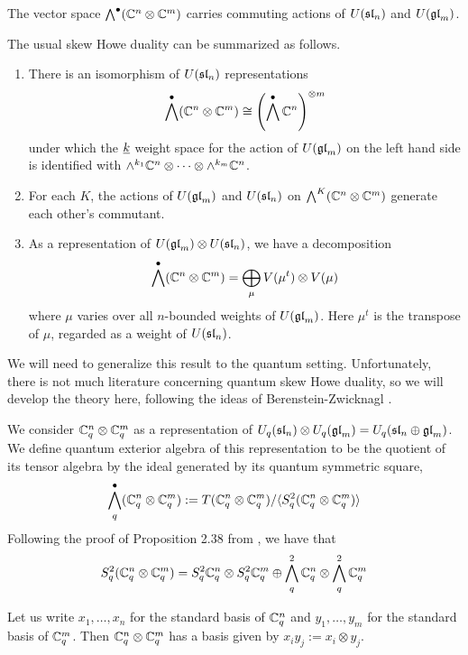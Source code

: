 \documentclass[11pt,leqno]{article}
\begin{document}
The vector space $\Alt^\bullet(\mathbb C^n \otimes \mathbb C^m)$ carries commuting actions of $U(\sl_n)$ and $U(\gl_m)$. 

\begin{thm}\mbox{}
The usual skew Howe duality can be summarized as follows.
\begin{enumerate}
\item There is an isomorphism of $ U(\sl_n) $ representations 
\begin{equation}
 \Alt^\bullet(\mathbb C^n \otimes \mathbb C^m) \cong \left( \Alt^\bullet \bC^n \right)^{\otimes m}
 \end{equation}
under which the $ \ul{k} $ weight space for the action of $ U(\gl_m) $ on the left hand side is identified with $\alt^{k_1} \mathbb C^n \otimes \cdots \otimes \alt^{k_m} \mathbb C^n$.
\item For each $ K $, the actions of $ U(\gl_m) $ and $ U(\sl_n) $ on $ \Alt^K(\bC^n \otimes \bC^m) $ generate each other's commutant.
\item As a representation of $ U(\gl_m) \otimes U(\sl_n)$, we have a decomposition
$$ \Alt^\bullet (\mathbb C^n \otimes \mathbb C^m) = \bigoplus_{\mu} V(\mu^t) \otimes V(\mu) $$
where $\mu$ varies over all $n$-bounded weights of $U(\gl_m)$. Here $\mu^t$ is the transpose of $\mu$, regarded as a weight of $U(\sl_n)$.
\end{enumerate}
\end{thm}

We will need to generalize this result to the quantum setting.  Unfortunately, there is not much literature concerning quantum skew Howe duality, so we will develop the theory here, following the ideas of Berenstein-Zwicknagl \cite{BZ}.  

We consider $ \bC^n_q \otimes \bC^m_q $ as a representation of $U_q(\sl_n) \otimes U_q(\gl_m) = U_q(\sl_n \oplus \gl_m) $.
We define quantum exterior algebra of this representation to be the quotient of its tensor algebra by the ideal generated by its quantum symmetric square,
$$\Alt^\bullet_q(\bC_q^n \otimes \bC_q^m) := T (\bC_q^n \otimes \bC_q^m) / \langle S^2_q (\bC_q^n \otimes \bC_q^m) \rangle$$
Following the proof of Proposition 2.38 from \cite{BZ}, we have that 
$$ S^2_q (\bC_q^n \otimes \bC_q^m) = S^2_q \bC_q^n \otimes S^2_q \bC_q^m \oplus \Alt^2_q \bC_q^n \otimes \Alt^2_q \bC_q^m $$

Let us write $ x_1, \dots, x_n $ for the standard basis of $ \bC_q^n $ and $ y_1, \dots, y_m $ for the standard basis of $ \bC_q^m $.  Then $ \bC_q^n \otimes \bC_q^m $ has a basis given by $ x_i y_j := x_i \otimes y_j $.
\end{document}
